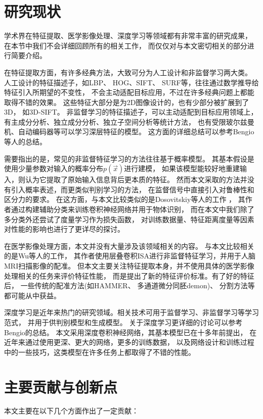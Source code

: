 \section{研究现状}
学术界在特征提取、医学影像处理、深度学习等领域都有非常丰富的研究成果，
在本节中我们不会详细回顾所有的相关工作，
而仅仅对与本文密切相关的部分进行简要介绍。

在特征提取方面，有许多经典方法，大致可分为人工设计和非监督学习两大类。
人工设计的特征描述子，如LBP\cite{ojala1994performance}、
HOG\cite{dalal2005histograms}、SIFT\cite{lowe1999object}、
SURF\cite{bay2006surf}等，往往通过数学推导给特征引入所期望的不变性，
不会主动适配目标应用，不过在许多经典问题上都能取得不错的效果。
这些特征大部分是为2D图像设计的，也有少部分被扩展到了3D，
如3D-SIFT\cite{scovanner20073}。
非监督学习的特征描述子，可以主动适配到目标应用领域上，
有主成分分析、独立成分分析、独立子空间分析等统计方法，
也有受限玻尔兹曼机、自动编码器等可以学习深层特征的模型。
这方面的详细总结可以参考Bengio等人的总结\cite{bengio2013representation}。

需要指出的是，常见的非监督特征学习的方法往往基于概率模型。
其基本假设是使用少量参数对输入的概率分布$p(\vec{x})$进行建模，
如果该模型能较好地重建输入，则认为它提取了原始输入信息背后更本质的特征。
然而本文采取的方法并没有引入概率表述，而更类似判别学习的方法，
在监督信号中直接引入对鲁棒性和区分力的要求。
在这方面，与本文比较类似的是Dosovitskiy等人的工作
\cite{dosovitskiy2014discriminative}，
其作者通过构建辅助分类来训练卷积神经网络并用于物体识别，
而在本文中我们除了多分类外还尝试了度量学习作为损失函数，
对训练数据量、特征距离度量等因素对性能的影响也进行了更详尽的探讨。

在医学影像处理方面，本文并没有大量涉及该领域相关的内容。
与本文比较相关的是Wu等人的工作\cite{wu2013unsupervised}，
其作者使用层叠卷积ISA进行非监督特征学习，并用于人脑MRI扫描影像的配准。
但本文主要关注特征提取本身，并不使用具体的医学影像处理相关的任务来评价特征性能，
而是提出了新的特征评价标准。有了好的特征后，
一些传统的配准方法(如HAMMER\cite{shen2002hammer}、
多通道微分同胚demon\cite{peyrat2010registration})、
分割方法等都可能从中获益。

深度学习是近年来热门的研究领域。相关技术可用于监督学习、非监督学习等学习范式，
并用于供判别模型和生成模型。
关于深度学习更详细的讨论可以参考Bengio的总结\cite{bengio2009learning}。
本文采用深度卷积神经网络，其基本模型已在十多年前提出\cite{lecun1998gradient}，
在近年来通过使用更深、更大的网络，更多的训练数据，
以及网络设计和训练过程中的一些技巧，这类模型在许多任务上都取得了不错的性能。


\section{主要贡献与创新点}
本文主要在以下几个方面作出了一定贡献：

